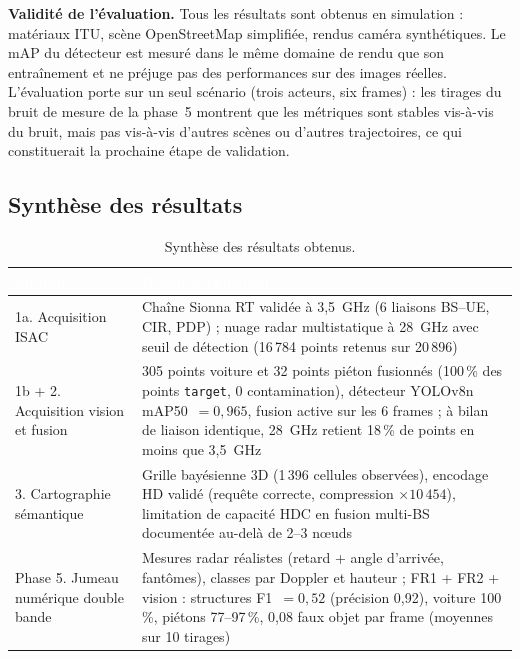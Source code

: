 \documentclass[12pt,a4paper,titlepage]{article}
\newcommand{\hd}[1]{\textcolor{white}{\textbf{#1}}}
\begin{document}
\textbf{Validité de l'évaluation.} Tous les résultats sont obtenus en simulation : matériaux ITU, scène OpenStreetMap simplifiée, rendus caméra synthétiques. Le mAP du détecteur est mesuré dans le même domaine de rendu que son entraînement et ne préjuge pas des performances sur des images réelles. L'évaluation porte sur un seul scénario (trois acteurs, six frames) : les tirages du bruit de mesure de la phase~5 montrent que les métriques sont stables vis-à-vis du bruit, mais pas vis-à-vis d'autres scènes ou d'autres trajectoires, ce qui constituerait la prochaine étape de validation.

\subsection{Synthèse des résultats}

\begin{table}[H]
    \centering
    \caption{Synthèse des résultats obtenus.}
    \begin{tabularx}{\textwidth}{F{3.8cm}L}
        \toprule
        \hd{Module} & \hd{Résultat principal} \\
        \midrule
        1a. Acquisition ISAC & Chaîne Sionna RT validée à 3,5~GHz (6 liaisons BS--UE, CIR, PDP) ; nuage radar multistatique à 28~GHz avec seuil de détection (16\,784 points retenus sur 20\,896) \\
        1b + 2. Acquisition vision et fusion & 305 points voiture et 32 points piéton fusionnés (100\,\% des points \texttt{target}, 0 contamination), détecteur YOLOv8n mAP50~$=0{,}965$, fusion active sur les 6 frames ; à bilan de liaison identique, 28~GHz retient 18\,\% de points en moins que 3,5~GHz \\
        3. Cartographie sémantique & Grille bayésienne 3D (1\,396 cellules observées), encodage HD validé (requête correcte, compression $\times10\,454$), limitation de capacité HDC en fusion multi-BS documentée au-delà de 2--3 n\oe uds \\
        Phase 5. Jumeau numérique double bande & Mesures radar réalistes (retard + angle d'arrivée, fantômes), classes par Doppler et hauteur ; FR1 + FR2 + vision : structures F1~$=0{,}52$ (précision 0,92), voiture 100\,\%, piétons 77--97\,\%, 0,08 faux objet par frame (moyennes sur 10 tirages) \\
        \bottomrule
    \end{tabularx}
\end{table}

\end{document}
